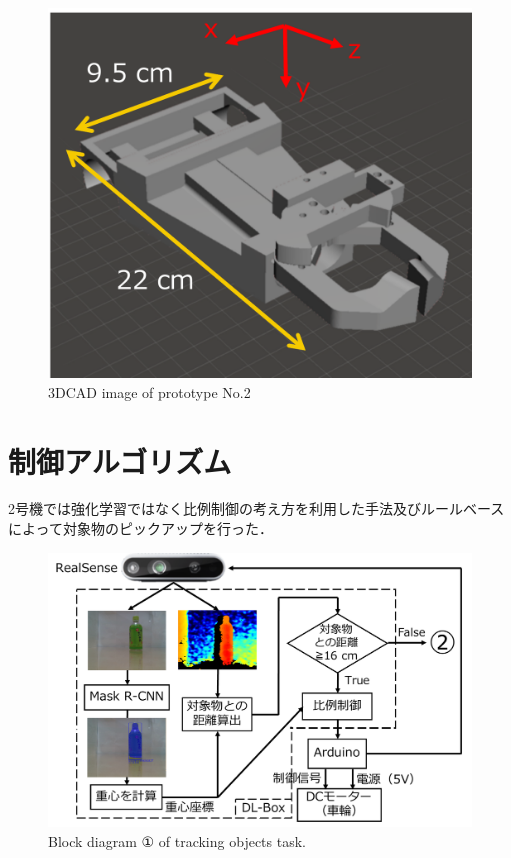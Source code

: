 \begin{figure}[H]
    \centering
    \includegraphics[width=0.85\linewidth]{figure/chapter4/2号機CAD-2}
    \caption{3DCAD image of prototype No.2}
    \label{fig:2号機CAD}
\end{figure}


\section{制御アルゴリズム}
2号機では強化学習ではなく比例制御の考え方を利用した手法及びルールベースによって対象物のピックアップを行った．

\begin{figure}[H]
    \centering
    \includegraphics[width=\linewidth]{figure/chapter4/2号機制御図_接近-2}
    \caption{Block diagram ① of tracking objects task.}
    \label{fig:2号機接近}
\end{figure}


